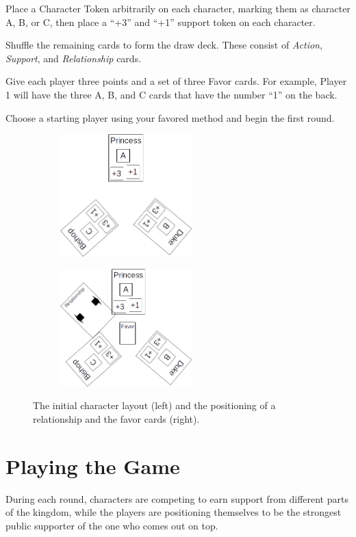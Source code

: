 \documentclass{article}
\begin{document}
Place a Character Token arbitrarily on each character, marking them
as character A, B, or C, then place a ``+3'' and ``+1'' support
token on each character.

Shuffle the remaining cards to form the draw deck. These consist of
\textit{Action}, \textit{Support}, and \textit{Relationship} cards.

Give each player three points and a set of three Favor cards. For example,
Player 1 will have the three A, B, and C cards that have the number ``1''
on the back.

Choose a starting player using your favored method and begin the first round.

\begin{figure}
  \centering
  \begin{subfigure}{0.5\textwidth}
    \centering
    \includegraphics[width=2in]{layout_initial}
  \end{subfigure}%
  \begin{subfigure}{0.5\textwidth}
    \centering
    \includegraphics[width=2in]{layout_after}
  \end{subfigure}
  \caption{The initial character layout (left) and the positioning
     of a relationship and the favor cards (right).}
\end{figure}


\section*{Playing the Game}

During each round, characters are competing to earn support from
different parts of the kingdom, while the players are positioning
themselves to be the strongest public supporter of the one who comes
out on top.
\end{document}
